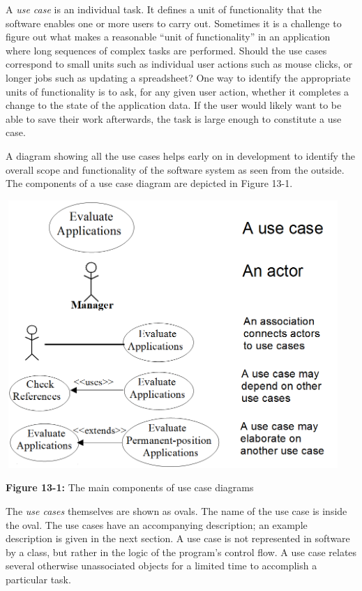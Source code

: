 A \textit{use case} is an individual task. It defines a
unit of functionality that the software enables one or more users to
carry out. Sometimes it is a challenge to figure out what makes a
reasonable ``unit of functionality'' in an
application where long sequences of complex tasks are performed. Should
the use cases correspond to small units such as individual user actions
such as mouse clicks, or longer jobs such as updating a spreadsheet?
One way to identify the appropriate units of functionality is to ask,
for any given user action, whether it completes a change to the state
of the application data. If the user would likely want to be able to
save their work afterwards, the task is large enough to constitute a
use case.

A diagram showing all the use cases helps early on in development to
identify the overall scope and functionality of the
software system as seen from the outside. The components of a use case
diagram are depicted in Figure 13-1.

\bigskip

\begin{center}
\includegraphics[width=5.0in,height=4in]{ub-img/usecase.png}

{\sffamily\bfseries Figure 13-1:}
{\sffamily The main components of use case diagrams}
\end{center}


The \textit{use cases} themselves are shown as ovals. The name of the
use case is inside the oval. The use cases have an accompanying
description; an example description is given in the next
section. A use case is not represented in software by a class, but
rather in the logic of the program's control flow. A
use case relates several otherwise unassociated objects for a limited
time to accomplish a particular task.

